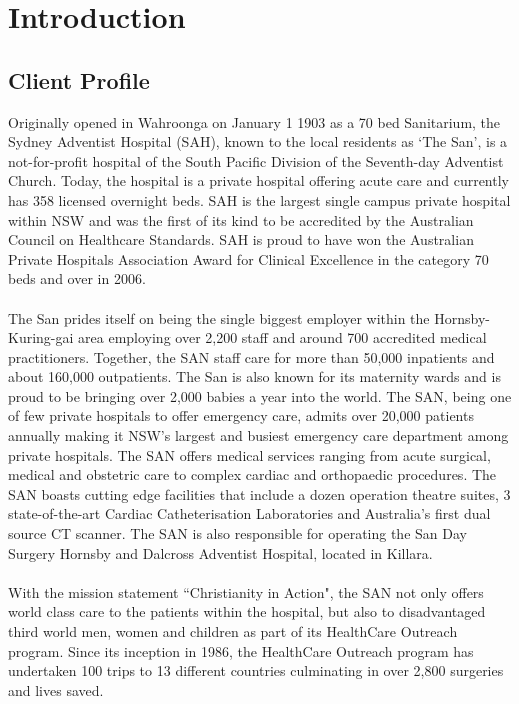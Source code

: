 \section{Introduction}
\subsection{Client Profile}
Originally opened in Wahroonga on January 1 1903 as a 70 bed Sanitarium, the Sydney Adventist Hospital (SAH), known to the local residents as `The San', is a not-for-profit hospital of the South Pacific Division of the Seventh-day Adventist Church.  Today, the hospital is a private hospital offering acute care and currently has 358 licensed overnight beds. SAH is the largest single campus private hospital within NSW and was the first of its kind to be accredited by the Australian Council on Healthcare Standards. SAH is proud to have won the Australian Private Hospitals Association Award for Clinical Excellence in the category 70 beds and over in 2006.
 \\ \\
The San prides itself on being the single biggest employer within the Hornsby-Kuring-gai area employing over 2,200 staff and around 700 accredited medical practitioners. Together, the SAN staff care for more than 50,000 inpatients and about 160,000 outpatients. The San is also known for its maternity wards and is proud to be bringing over 2,000 babies a year into the world. The SAN, being one of few private hospitals to offer emergency care, admits over 20,000 patients annually making it NSW's largest and busiest emergency care department among private hospitals. The SAN offers medical services ranging from acute surgical, medical and obstetric care to complex cardiac and orthopaedic procedures. The SAN boasts cutting edge facilities that include a dozen operation theatre suites, 3 state-of-the-art Cardiac Catheterisation Laboratories and Australia's first dual source CT scanner. The SAN is also responsible for operating the San Day Surgery Hornsby and Dalcross Adventist Hospital, located in Killara.
\\ \\
With the mission statement ``Christianity in Action", the SAN not only offers world class care to the patients within the hospital, but also to disadvantaged third world men, women and children as part of its HealthCare Outreach program. Since its inception in 1986, the HealthCare Outreach program has undertaken 100 trips to 13 different countries culminating in over 2,800 surgeries and lives saved. 
\newpage

